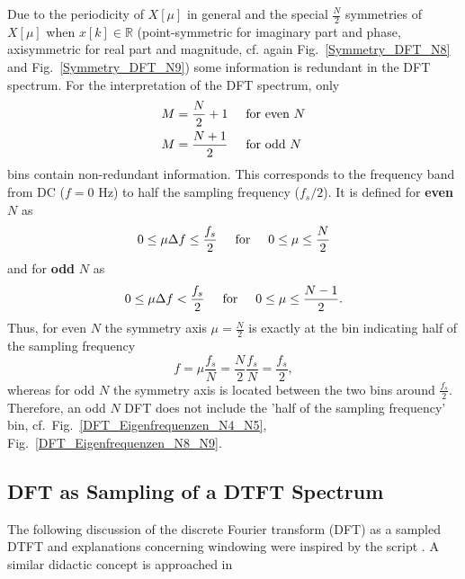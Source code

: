 \documentclass[11pt,a4paper,DIV=12]{scrartcl}
\begin{document}
%
Due to the periodicity of $X[\mu]$ in general and the special $\frac{N}{2}$
symmetries of $X[\mu]$ when $x[k]\in\mathbb{R}$
(point-symmetric for imaginary part and phase, axisymmetric for real part and
magnitude, cf. again Fig.~\ref{Symmetry_DFT_N8} and Fig.~\ref{Symmetry_DFT_N9})
some information is redundant in the DFT spectrum.
%
For the interpretation of the DFT spectrum, only
\begin{align}
M&=\frac{N}{2}+1 \hspace{5mm}\text{for even }N\nonumber\\
M&=\frac{N+1}{2} \hspace{5mm}\text{for odd }N
\end{align}
bins contain non-redundant information.
%
This corresponds to the frequency band from DC ($f=0$ Hz) to half the sampling
frequency ($f_s/2$).
%
It is defined for \textbf{even} $N$ as
\begin{equation}
0\leq\mu\Delta f\leq\frac{f_s}{2} \hspace{5mm}\text{for}\hspace{5mm} 0\leq\mu\leq\frac{N}{2}
\end{equation}
and for \textbf{odd} $N$ as
\begin{equation}
0\leq\mu\Delta f<\frac{f_s}{2} \hspace{5mm}\text{for}\hspace{5mm} 0\leq\mu\leq\frac{N-1}{2}.
\end{equation}
%
Thus, for even $N$ the symmetry axis $\mu=\frac{N}{2}$ is exactly at the bin
indicating half of the sampling frequency
%
\begin{equation}
f=\mu\frac{f_s}{N}=\frac{N}{2}\frac{f_s}{N}=\frac{f_s}{2},
\end{equation}
%
whereas for odd $N$ the symmetry axis is located between the two bins around
$\frac{f_s}{2}$.
%
Therefore, an odd $N$ DFT does not include the 'half of the sampling frequency'
bin, cf.~Fig.~\ref{DFT_Eigenfrequenzen_N4_N5}, Fig.~\ref{DFT_Eigenfrequenzen_N8_N9}.

\subsection{DFT as Sampling of a DTFT Spectrum}
The following discussion of the discrete Fourier transform (DFT) as a sampled
DTFT and explanations concerning windowing were inspired by the
script \cite{Moeser2011}. A similar didactic concept
is approached in \cite[Ch.~7.3,~7.4]{Kammeyer2002}
\end{document}
